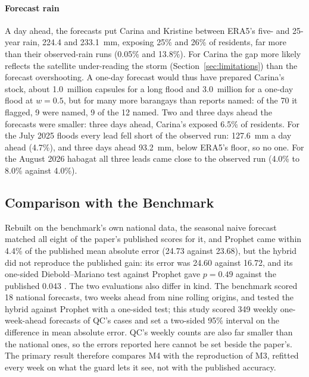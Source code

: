 \paragraph{Forecast rain}
A day ahead, the forecasts put Carina and Kristine between ERA5's five- and 25-year rain, 224.4
and 233.1~mm, exposing 25\% and 26\% of residents, far more than their observed-rain runs (0.05\%
and 13.8\%). For Carina the gap more likely reflects the satellite under-reading the storm
(Section~\ref{sec:limitations}) than the forecast overshooting. A one-day forecast would thus have prepared Carina's
stock, about 1.0~million capsules for a long flood and 3.0~million for a one-day flood at
$w = 0.5$, but for many more barangays than reports named: of the 70 it flagged, 9 were named, 9
of the 12 named. Two and three days ahead the forecasts were smaller: three days ahead,
Carina's exposed 6.5\% of residents. For the July 2025 floods every lead fell short of the
observed run: 127.6~mm a day ahead (4.7\%), and three days ahead 93.2~mm, below ERA5's floor, so
no one. For the August 2026 habagat all three leads came close to the observed run (4.0\% to
8.0\% against 4.0\%).

\subsection{Comparison with the Benchmark}\label{sec:results-benchmark}

Rebuilt on the benchmark's own national data, the seasonal naive forecast matched all eight of
the paper's published scores for it, and Prophet came within 4.4\% of the published mean
absolute error (24.73 against 23.68), but the hybrid did not reproduce the published gain: its
error was 24.60 against 16.72, and its one-sided Diebold--Mariano test against Prophet gave
$p = 0.49$ against the published 0.043 \parencite{latigay2026}. The two evaluations also differ
in kind. The benchmark scored 18 national forecasts, two weeks ahead from nine rolling origins,
and tested the hybrid against Prophet with a one-sided test; this study scored 349 weekly
one-week-ahead forecasts of QC's cases and set a two-sided 95\% interval on the difference in
mean absolute error. QC's weekly counts are also far smaller than the national ones, so the
errors reported here cannot be set beside the paper's. The primary result therefore compares M4
with the reproduction of M3, refitted every week on what the guard lets it see, not with the
published accuracy.
